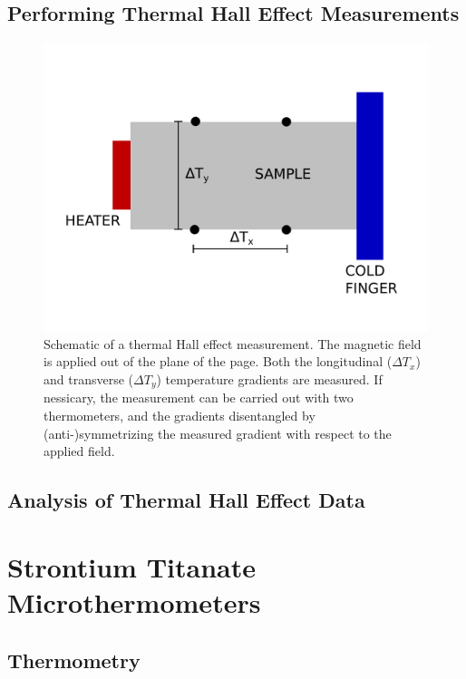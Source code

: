\documentclass{thesis-umich}
\begin{document}
\section{Performing Thermal Hall Effect Measurements}
\begin{figure}
	\caption[Schematic of a thermal Hall effect measurement]{Schematic of a thermal Hall effect measurement. The magnetic field is applied out of the plane of the page. Both the longitudinal ($\Delta T_x$) and transverse ($\Delta T_y$) temperature gradients are measured. If nessicary, the measurement can be carried out with two thermometers, and the gradients disentangled by (anti-)symmetrizing the measured gradient with respect to the applied field.}
	\includegraphics[width=\columnwidth]{figures/thall_geometry.pdf}
\end{figure}
\section{Analysis of Thermal Hall Effect Data}

\chapter{Strontium Titanate Microthermometers}

\section{Thermometry}
\end{document}
